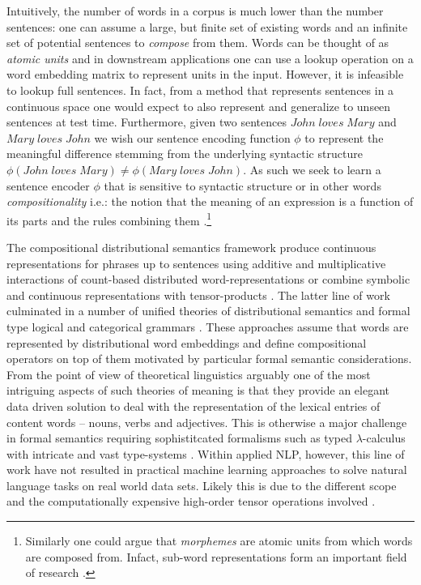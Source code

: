 Intuitively, the number of words in a corpus is much
lower than the number sentences: one can assume a large, but finite set
of existing words and an infinite set of
potential sentences to \emph{compose} from them.
Words can be thought of as \emph{atomic units} and
in downstream applications one can use a lookup operation on a word embedding matrix
to represent units in the input. However, it is infeasible to lookup full sentences.
In fact, from a method that represents sentences in a continuous space one would expect
to also represent and generalize to unseen sentences at test time.
Furthermore, given two sentences $\mathit{John \; loves \; Mary}$ and
$\mathit{Mary \; loves \; John}$ we wish our sentence encoding function
$\phi$ to represent the meaningful difference stemming from the underlying syntactic structure
$\phi(\mathit{John \; loves \; Mary}) \neq \phi(\mathit{Mary \; loves \; John})$.
As such we seek to learn a sentence encoder $\phi$ that is sensitive to
syntactic structure or in other words \emph{compositionality} i.e.:
the notion that the meaning of an expression is
a function of its parts and the rules combining them \citep{montague1970english}.\footnote{Similarly one could argue that \emph{morphemes} are atomic units from which words are composed from. Infact, sub-word
representations form an important field of research \citep{bojanowski2017enriching}.}

The compositional distributional semantics  framework  produce
continuous representations for phrases up to sentences using additive and multiplicative interactions
of count-based distributed word-representations \citep{mitchell2008vector} or combine symbolic and
continuous representations with tensor-products \citep{clark2007combining}.
The latter line of work culminated in a number of unified theories of
distributional semantics and formal type logical and categorical grammars
\citep{coecke2010mathematical,clarke2012context,baroni2014frege}.
These approaches assume that words are represented by distributional word embeddings
and define compositional operators on top of them motivated by particular formal
semantic considerations. From the point of view of theoretical linguistics arguably 
one of the most intriguing aspects of such theories of meaning is that 
they provide an elegant data driven solution to deal with the representation of the lexical entries of
content words -- nouns, verbs and adjectives. This is  otherwise a major challenge in formal semantics
requiring sophistitcated formalisms such as typed $\lambda$-calculus with intricate and vast
type-systems \citep{asher2011lexical}. Within applied NLP, however, this line of work have not resulted in
practical machine learning approaches to solve natural language tasks
on real world data sets. Likely this is due to the different scope and
the computationally expensive high-order
tensor operations involved \citep{bowman2016modeling}.

